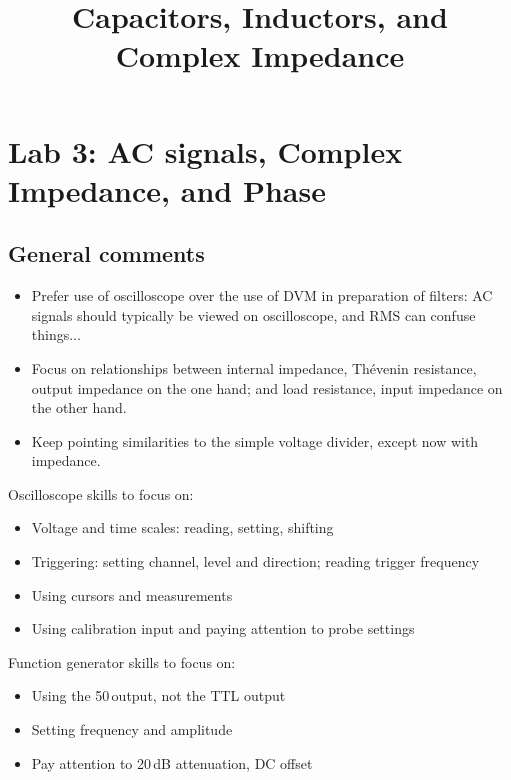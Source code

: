 \documentclass{article}
\title{Capacitors, Inductors, and Complex Impedance}
\begin{document}
\maketitle

\section{Lab 3: AC signals, Complex Impedance, and Phase}

\subsection*{General comments}

\begin{itemize}
\item Prefer use of oscilloscope over the use of DVM in preparation of filters: AC signals should typically be viewed on oscilloscope, and RMS can confuse things...
\item Focus on relationships between internal impedance, Th\'{e}venin resistance, output impedance on the one hand; and load resistance, input impedance on the other hand.
\item Keep pointing similarities to the simple voltage divider, except now with impedance.
\end{itemize}

Oscilloscope skills to focus on:
\begin{itemize}
\item Voltage and time scales: reading, setting, shifting
\item Triggering: setting channel, level and direction; reading trigger frequency
\item Using cursors and measurements
\item Using calibration input and paying attention to probe settings
\end{itemize}

Function generator skills to focus on:
\begin{itemize}
\item Using the 50\,\Ohm output, not the TTL output
\item Setting frequency and amplitude
\item Pay attention to 20\,dB attenuation, DC offset
\end{itemize}
\end{document}
